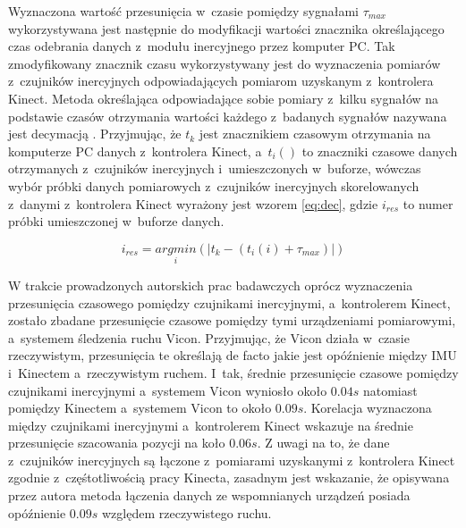 Wyznaczona wartość przesunięcia w~czasie pomiędzy sygnałami $\tau_{max}$ wykorzystywana jest następnie do modyfikacji wartości znacznika określającego czas odebrania danych z~modułu inercyjnego przez komputer PC. Tak zmodyfikowany znacznik czasu wykorzystywany jest do wyznaczenia pomiarów z~czujników inercyjnych odpowiadających pomiarom uzyskanym z~kontrolera Kinect. Metoda określająca odpowiadające sobie pomiary z~kilku sygnałów na podstawie czasów otrzymania wartości każdego z~badanych sygnałów nazywana jest decymacją \cite{Hinton2001}.
Przyjmując, że $t_k$ jest znacznikiem czasowym otrzymania na komputerze PC danych z~kontrolera Kinect, a~$t_i()$ to znaczniki czasowe danych  otrzymanych z~czujników inercyjnych i~umieszczonych w~buforze, wówczas wybór próbki danych pomiarowych z~czujników inercyjnych skorelowanych z~danymi z~kontrolera Kinect wyrażony jest wzorem \eqref{eq:dec}, gdzie $i_{res}$ to numer próbki umieszczonej w~buforze danych.

\begin{equation}
	i_{res} = \underset{i}{argmin}(|t_k-(t_i(i) + \tau_{max})|)
	\label{eq:dec}
\end{equation}

W trakcie prowadzonych autorskich prac badawczych oprócz wyznaczenia przesunięcia czasowego pomiędzy czujnikami inercyjnymi, a~kontrolerem Kinect, zostało zbadane przesunięcie czasowe pomiędzy tymi urządzeniami pomiarowymi, a~systemem śledzenia ruchu Vicon. Przyjmując, że Vicon działa w~czasie rzeczywistym, przesunięcia te określają de facto jakie jest opóźnienie między IMU i~Kinectem a~rzeczywistym ruchem. I~tak, średnie przesunięcie czasowe pomiędzy czujnikami inercyjnymi a~systemem Vicon wyniosło około $0.04s$ natomiast pomiędzy Kinectem a~systemem Vicon to około $0.09s$. Korelacja wyznaczona między czujnikami inercyjnymi a~kontrolerem Kinect wskazuje na średnie przesunięcie szacowania pozycji na koło $0.06s$. Z uwagi na to, że dane z~czujników inercyjnych są łączone z~pomiarami uzyskanymi z~kontrolera Kinect zgodnie z~częśtotliwością pracy Kinecta, zasadnym jest wskazanie, że opisywana przez autora metoda łączenia danych ze wspomnianych urządzeń posiada opóźnienie $0.09s$ względem rzeczywistego ruchu.

